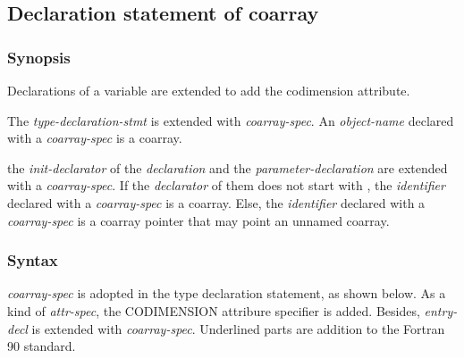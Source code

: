 \subsection{Declaration statement of coarray}
\label{sec:Declaration statement of coarray}

\subsubsection*{Synopsis}
Declarations of a variable are extended to add the codimension attribute.

{\onlyF}
The {\it type-declaration-stmt} is extended with {\it coarray-spec}.
An {\it object-name} declared with a {\it coarray-spec} is a coarray.

{\onlyC} 
the {\it init-declarator} of the {\it declaration} and 
the {\it parameter-declaration} are extended with a {\it coarray-spec}.
If the {\it declarator} of them does not start with {\tt *},
the {\it identifier} declared with a {\it coarray-spec} is a coarray.
Else, 
the {\it identifier} declared with a {\it coarray-spec} is a coarray pointer
that may point an unnamed coarray.


\subsubsection*{Syntax \onlyF}
{\it coarray-spec} is adopted in the type declaration statement, as shown below.
As a kind of {\it attr-spec}, the CODIMENSION attribure specifier is added.
Besides, {\it entry-decl} is extended with {\it coarray-spec}.
Underlined parts are addition to the Fortran 90 standard.

